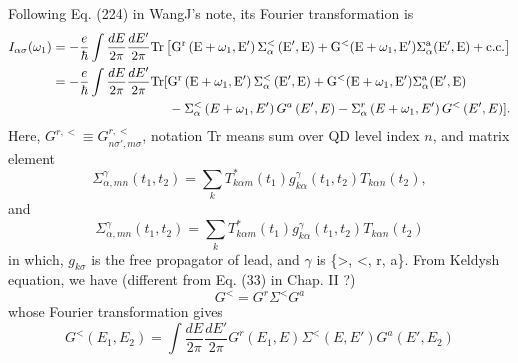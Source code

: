 \documentclass[11pt,a4paper]{article}
\begin{document}
Following Eq. (224) in WangJ's note, its Fourier transformation is
\begin{equation}
\begin{split}
I_{\alpha\sigma}(\omega_{1})&=-\frac{e}{\hbar}\int \frac{d E}{2 \pi} \frac{d E^{\prime}}{2 \pi} \rm{Tr}\left[G^{r}\left(E+\omega_{1}, E^{\prime}\right) \Sigma_{\alpha}^{<}\left(E^{\prime}, E\right) + G^{<}(E+\omega_{1}, E')\Sigma_{\alpha}^{a}(E', E) + c.c.\right]\\
&=-\frac{e}{\hbar}\int \frac{d E}{2 \pi} \frac{d E^{\prime}}{2 \pi} \rm{Tr} [ G^{r}\left(E+\omega_{1}, E^{\prime}\right) \Sigma_{\alpha}^{<}\left(E^{\prime}, E\right) + G^{<}(E+\omega_{1}, E')\Sigma_{\alpha}^{a}(E', E) \\
& \qquad \qquad \qquad\qquad\quad  -\Sigma_{\alpha}^{<}\left(E+\omega_{1}, E'\right) G^{a}\left(E', E\right)-\Sigma_{\alpha}^{r}\left(E+\omega_{1}, E'\right) G^{<} \left(E', E\right) ] .
\end{split}
\end{equation}
Here, $G^{r,<} \equiv G_{n\sigma',m\sigma}^{r,<}$, notation Tr means sum over QD level index $n$, and matrix element
\begin{equation}
\Sigma_{\alpha,mn}^{\gamma}(t_{1}, t_{2}) = \sum_{k} T_{k\alpha m}^{*}(t_{1}) g_{k\alpha}^{\gamma}(t_{1}, t_{2}) T_{k\alpha n}(t_{2}),
\label{eq:sigma}
\end{equation}
and
\begin{equation}
\Sigma_{\alpha, m n}^{\gamma}\left(t_{1}, t_{2}\right)=\sum_{k} T_{k \alpha m}^{*}\left(t_{1}\right) g_{k \alpha}^{\gamma}\left(t_{1}, t_{2}\right) T_{k \alpha n}\left(t_{2}\right)
\end{equation}
in which, $g_{k\sigma}$ is the free propagator of lead, and $\gamma$ is \{>, <, r, a\}. From Keldysh equation, we have (different from Eq. (33) in Chap. II ?)
\begin{equation}
G^{<}=G^{r} \Sigma^{<} G^{a}
\label{eq:r<a}
\end{equation}
whose Fourier transformation gives
\begin{equation}
G^{<}(E_{1},E_{2})=\int\frac{dE}{2\pi}\frac{dE'}{2\pi}G^{r}(E_{1}, E) \Sigma^{<}(E, E') G^{a}(E', E_{2})
\end{equation}
\end{document}
